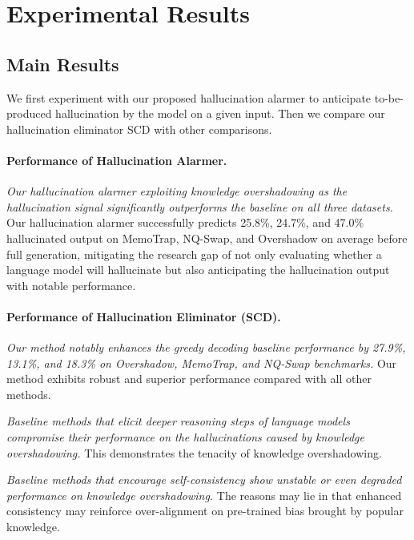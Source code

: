 \section{Experimental Results}



\subsection{Main Results}



We first experiment with our proposed hallucination alarmer to anticipate to-be-produced hallucination by the model on a given input. Then we compare our hallucination eliminator SCD with other comparisons.




\paragraph{Performance of Hallucination Alarmer. } 
\textit{Our hallucination alarmer exploiting knowledge overshadowing as the hallucination signal significantly outperforms the baseline on all three datasets.} 
Our hallucination alarmer successfully predicts 25.8\%, 24.7\%, and 47.0\% hallucinated output on MemoTrap, NQ-Swap, and Overshadow on average before full generation, mitigating the research gap of not only evaluating whether a language model will hallucinate but also anticipating the hallucination output with notable performance.


\paragraph{Performance of Hallucination Eliminator (SCD).}
\textit{Our method notably enhances the greedy decoding baseline performance by 27.9\%, 13.1\%, and 18.3\% on Overshadow, MemoTrap, and NQ-Swap benchmarks. }
Our method exhibits robust and superior performance compared with all other methods.

\textit{Baseline methods that elicit deeper reasoning steps of language models compromise their performance on the hallucinations caused by knowledge overshadowing. }
This demonstrates the tenacity of knowledge overshadowing.

\textit{Baseline methods that encourage self-consistency show unstable or even degraded performance on knowledge overshadowing.} The reasons may lie in that enhanced consistency may reinforce over-alignment on pre-trained bias brought by popular knowledge.


